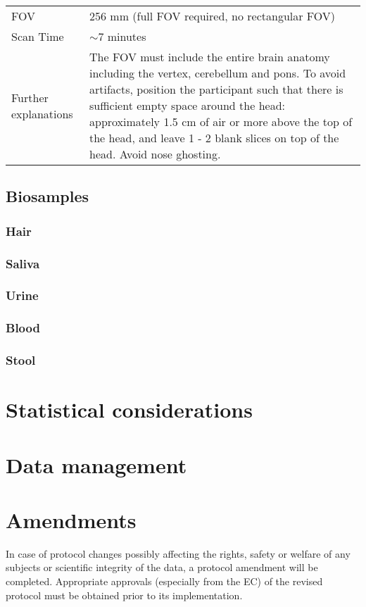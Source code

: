 \begin{table}[H]
\begin{tabularx}{\linewidth}{@{} s | X @{}}
FOV                       								& 256 mm (full FOV required, no rectangular FOV)                                            \\
Scan Time                 								& $\sim$7 minutes                                                                           \\
Further explanations      						&  The FOV must include the entire brain anatomy including the vertex, cerebellum and pons. To avoid artifacts, position the participant such that there is sufficient empty space around the head: approximately 1.5 cm of air or more above the top of the head, and leave 1 - 2 blank slices on top of the head. Avoid nose ghosting.                                                                                        
\end{tabularx}
\end{table}

\subsection{Biosamples}
\subsubsection{Hair}
\subsubsection{Saliva}
\subsubsection{Urine}
\subsubsection{Blood}
\subsubsection{Stool}

\section{Statistical considerations}

\section{Data management}

\section{Amendments}
In case of protocol changes possibly affecting the rights, safety or welfare of any subjects or scientific integrity of the data, a protocol amendment will be completed. Appropriate approvals (especially from the \ac{EC}) of the revised protocol must be obtained prior to its implementation.

